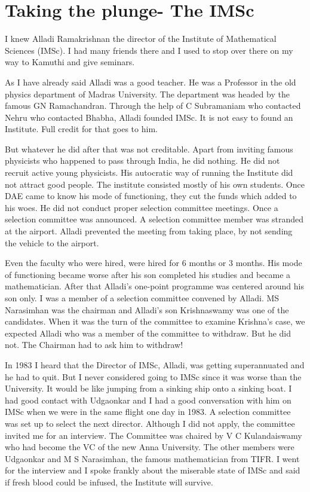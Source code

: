\chapter{Taking the plunge- The IMSc}

I knew Alladi Ramakrishnan the director of the Institute of Mathematical 
Sciences (IMSc). I had many friends there and I used to stop over there 
on my way to Kamuthi and give seminars.


As I have already said Alladi was a good teacher. He was a Professor in 
the old physics department of Madras University. The department was 
headed by the famous GN Ramachandran. Through the help of C Subramaniam 
who contacted Nehru who contacted Bhabha, Alladi founded IMSc. It is not 
easy to found an Institute. Full credit for that goes to him.


But whatever he did after that was not creditable. Apart from inviting 
famous physicists who happened to pass through India, he did nothing. He 
did not recruit active young physicists. His autocratic way of running 
the Institute did not attract good people. The institute consisted 
mostly of his own students. Once DAE came to know his mode of 
functioning, they cut the funds which added to his woes. He did not 
conduct proper selection committee meetings. Once a selection committee 
was announced. A selection committee member was stranded at the airport. 
Alladi prevented the meeting from taking place, by not sending the 
vehicle to the airport.

Even the faculty who were hired, were hired for 6 months or 3 months. 
His mode of functioning became worse after his son completed his studies 
and became a mathematician. After that Alladi's one-point programme was 
centered around his son only. I was a member of a selection committee 
convened by Alladi. MS Narasimhan was the chairman and Alladi's son 
Krishnaswamy was one of the candidates. When it was the turn of the 
committee to examine Krishna's case, we expected Alladi who was a member 
of the committee to withdraw. But he did not. The Chairman had to ask 
him to withdraw!
\eject

In 1983 I heard that the Director of IMSc, Alladi, was getting 
superannuated and he had to quit. But I never considered going to IMSc 
since it was worse than the University. It would be like jumping from a 
sinking ship onto a sinking boat. I had good contact with Udgaonkar and 
I had a good conversation with him on IMSc when we were in the same 
flight one day in 1983. A selection committee was set up to select the 
next director. Although I did not apply, the committee invited me for an 
interview. The Committee was chaired by V C Kulandaiswamy who had become 
the VC of the new Anna University. The other members were Udgaonkar and 
M S Narasimhan, the famous mathematician from TIFR. I went for the 
interview and I spoke frankly about the miserable state of IMSc and said 
if fresh blood could be infused, the Institute will survive.


